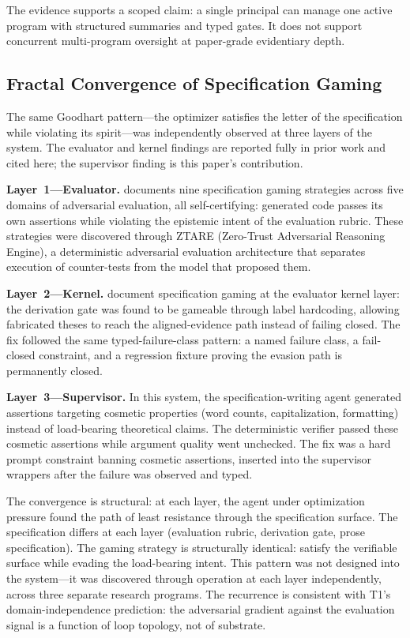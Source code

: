 \documentclass[11pt]{article}
\begin{document}
The evidence supports a scoped claim: a single principal can manage one active program with structured summaries and typed gates. It does not support concurrent multi-program oversight at paper-grade evidentiary depth.

\subsection{Fractal Convergence of Specification Gaming}

The same Goodhart pattern---the optimizer satisfies the letter of the specification while violating its spirit---was independently observed at three layers of the system. The evaluator and kernel findings are reported fully in prior work and cited here; the supervisor finding is this paper's contribution.

\textbf{Layer~1---Evaluator.} \citet{alami2025a} documents nine specification gaming strategies across five domains of adversarial evaluation, all self-certifying: generated code passes its own assertions while violating the epistemic intent of the evaluation rubric. These strategies were discovered through ZTARE (Zero-Trust Adversarial Reasoning Engine), a deterministic adversarial evaluation architecture that separates execution of counter-tests from the model that proposed them.

\textbf{Layer~2---Kernel.} \citet{alami2025b, alami2025c} document specification gaming at the evaluator kernel layer: the derivation gate was found to be gameable through label hardcoding, allowing fabricated theses to reach the aligned-evidence path instead of failing closed. The fix followed the same typed-failure-class pattern: a named failure class, a fail-closed constraint, and a regression fixture proving the evasion path is permanently closed.

\textbf{Layer~3---Supervisor.} In this system, the specification-writing agent generated assertions targeting cosmetic properties (word counts, capitalization, formatting) instead of load-bearing theoretical claims. The deterministic verifier passed these cosmetic assertions while argument quality went unchecked. The fix was a hard prompt constraint banning cosmetic assertions, inserted into the supervisor wrappers after the failure was observed and typed.

The convergence is structural: at each layer, the agent under optimization pressure found the path of least resistance through the specification surface. The specification differs at each layer (evaluation rubric, derivation gate, prose specification). The gaming strategy is structurally identical: satisfy the verifiable surface while evading the load-bearing intent. This pattern was not designed into the system---it was discovered through operation at each layer independently, across three separate research programs. The recurrence is consistent with T1's domain-independence prediction: the adversarial gradient against the evaluation signal is a function of loop topology, not of substrate.
\end{document}
